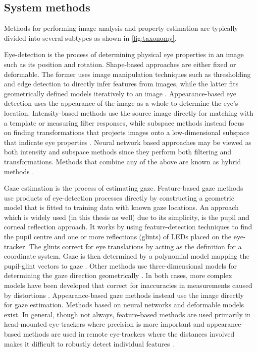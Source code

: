 \subsection{System methods}
Methods for performing image analysis and property estimation are typically divided into several subtypes as shown in \cref{fig:taxonomy}. 

Eye-detection is the process of determining physical eye properties in an image such as its position and rotation. Shape-based approaches are either fixed or deformable. The former uses image manipulation techniques such as thresholding and edge detection to directly infer features from images, while the latter fits geometrically defined models iteratively to an image \parencite{hansen2009eye}. Appearance-based eye detection uses the appearance of the image as a whole to determine the eye's location. Intensity-based methods use the source image directly for matching with a template or measuring filter responses, while subspace methods instead focus on finding transformations that projects images onto a low-dimensional subspace that indicate eye properties \parencite{hansen2009eye}. Neural network based approaches may be viewed as both intensity and subspace methods since they perform both filtering and transformations. Methods that combine any of the above are known as hybrid methods \parencite{hansen2009eye}. 

Gaze estimation is the process of estimating gaze. Feature-based gaze methods use products of eye-detection processes directly by constructing a geometric model that is fitted to training data with known gaze locations. An approach which is widely used (in this thesis as well) due to its simplicity, is the pupil and corneal reflection approach. It works by using feature-detection techniques to find the pupil centre and one or more reflections (glints) of LEDs placed on the eye-tracker. The glints correct for eye translations by acting as the definition for a coordinate system. Gaze is then determined by a polynomial model mapping the pupil-glint vectors to gaze \parencite{hansen2009eye}. Other methods use three-dimensional models for determining the gaze direction geometrically \parencite{hansen2009eye}. In both cases, more complex models have been developed that correct for inaccuracies in measurements caused by distortions \parencite{hansen2009eye}. Appearance-based gaze methods instead use the image directly for gaze estimation. Methods based on neural networks and deformable models exist. In general, though not always, feature-based methods are used primarily in head-mounted eye-trackers where precision is more important and appearance-based methods are used in remote eye-trackers where the distances involved makes it difficult to robustly detect individual features \parencite{hansen2009eye}.

